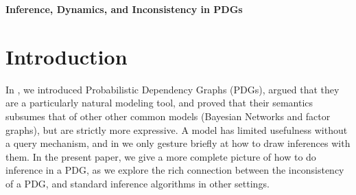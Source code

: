 \documentclass{article}
\theoremstyle{plain}
\theoremstyle{definition}
\theoremstyle{remark}
\newcommand\smid{\!\mid\!}
\newcommand\MAP{\mathrm{MAP}}
\newcommand\ado{\mathrm{do}}
\begin{document}
\begin{center}
	{\bfseries\Large Inference, Dynamics, and Inconsistency in PDGs}
\end{center}

\section{Introduction}

In \cite{}, we introduced Probabilistic Dependency Graphs (PDGs), argued that they are a particularly natural modeling tool, and proved that their semantics subsumes that of other other common models (Bayesian Networks and factor graphs), but are strictly more expressive.
A model has limited usefulness without a query mechanism, and in \cite{} we only gesture briefly at how to draw inferences with them.
In the present paper, we give a more complete picture of how to do inference in a PDG, as we explore the rich connection between the inconsistency of a PDG, and standard inference algorithms in other settings.


%
%
\end{document}
